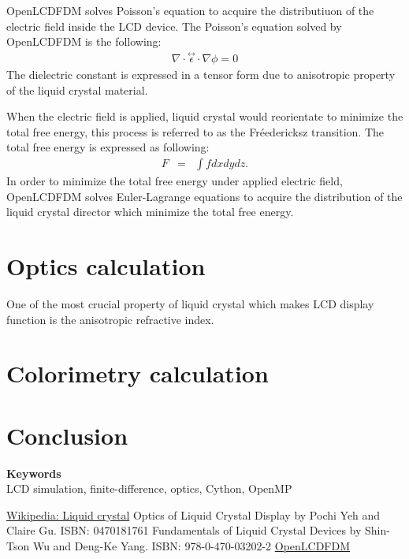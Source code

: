 \documentclass[11pt, a4paper]{article} %
\def\keywords#1{\begin{center}{\bf Keywords}\\{#1}\end{center}} %
\begin{document}
\begin{multicols}{2}
OpenLCDFDM solves Poisson's equation to acquire the distributiuon of the electric field inside the LCD device. The Poisson's equation solved by OpenLCDFDM is the following: 
\begin{eqnarray}
\nabla\cdot\stackrel{\leftrightarrow}{\epsilon}\cdot\nabla\phi = 0
\label{eq:Poisson_anisotropiv}
\end{eqnarray}
The dielectric constant is expressed in a tensor form due to anisotropic property of the liquid crystal material.

When the electric field is applied, liquid crystal would reorientate to minimize the total free energy, this process is referred to as the Fréedericksz transition.
The total free energy is expressed as following:
\begin{eqnarray}
F&=&\int f dxdydz.
\label{eq:total_free_energy}
\end{eqnarray}
In order to minimize the total free energy under applied electric field, OpenLCDFDM solves Euler-Lagrange equations to acquire the distribution of the liquid crystal director which minimize the total free energy.

\section{Optics calculation}
One of the most crucial property of liquid crystal which makes LCD display function is the anisotropic refractive index. 

\section{Colorimetry calculation}


\section{Conclusion}


\keywords{LCD simulation, finite-difference, optics, Cython, OpenMP} %


\begin{thebibliography}{4}
\href{http://en.wikipedia.org/wiki/Liquid_crystal}{Wikipedia: Liquid crystal}
Optics of Liquid Crystal Display by Pochi Yeh and Claire Gu. ISBN: 0470181761
Fundamentals of Liquid Crystal Devices by Shin-Tson Wu and Deng-Ke Yang. ISBN: 978-0-470-03202-2
\href{https://github.com/xingularity/OpenLCDFDM}{OpenLCDFDM}
\end{thebibliography}
\end{multicols}
\end{document}
